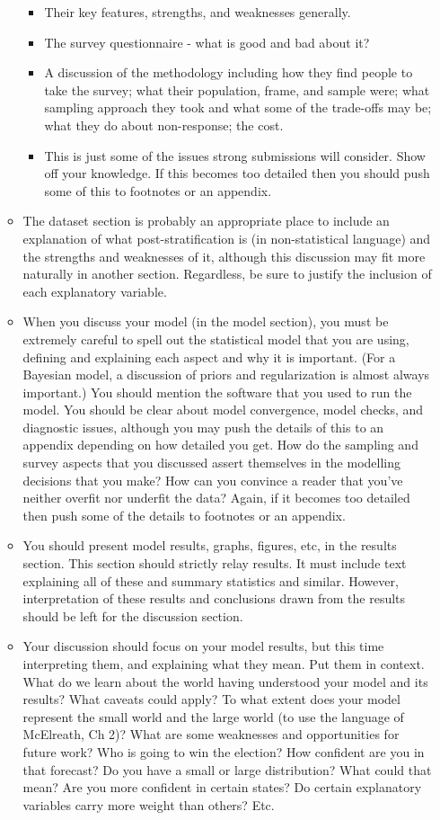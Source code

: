 \documentclass[
]{book}
\providecommand{\tightlist}{%
  \setlength{\itemsep}{0pt}\setlength{\parskip}{0pt}}
\begin{document}
\begin{itemize}
\begin{itemize}
    \begin{itemize}
    \tightlist
    \item
      Their key features, strengths, and weaknesses generally.
    \item
      The survey questionnaire - what is good and bad about it?
    \item
      A discussion of the methodology including how they find people to take the survey; what their population, frame, and sample were; what sampling approach they took and what some of the trade-offs may be; what they do about non-response; the cost.
    \item
      This is just some of the issues strong submissions will consider. Show off your knowledge. If this becomes too detailed then you should push some of this to footnotes or an appendix.
    \end{itemize}
  \item
    The dataset section is probably an appropriate place to include an explanation of what post-stratification is (in non-statistical language) and the strengths and weaknesses of it, although this discussion may fit more naturally in another section. Regardless, be sure to justify the inclusion of each explanatory variable.
  \item
    When you discuss your model (in the model section), you must be extremely careful to spell out the statistical model that you are using, defining and explaining each aspect and why it is important. (For a Bayesian model, a discussion of priors and regularization is almost always important.) You should mention the software that you used to run the model. You should be clear about model convergence, model checks, and diagnostic issues, although you may push the details of this to an appendix depending on how detailed you get. How do the sampling and survey aspects that you discussed assert themselves in the modelling decisions that you make? How can you convince a reader that you've neither overfit nor underfit the data? Again, if it becomes too detailed then push some of the details to footnotes or an appendix.
  \item
    You should present model results, graphs, figures, etc, in the results section. This section should strictly relay results. It must include text explaining all of these and summary statistics and similar. However, interpretation of these results and conclusions drawn from the results should be left for the discussion section.
  \item
    Your discussion should focus on your model results, but this time interpreting them, and explaining what they mean. Put them in context. What do we learn about the world having understood your model and its results? What caveats could apply? To what extent does your model represent the small world and the large world (to use the language of McElreath, Ch 2)? What are some weaknesses and opportunities for future work? Who is going to win the election? How confident are you in that forecast? Do you have a small or large distribution? What could that mean? Are you more confident in certain states? Do certain explanatory variables carry more weight than others? Etc.

\end{itemize}
\end{itemize}
\end{document}
